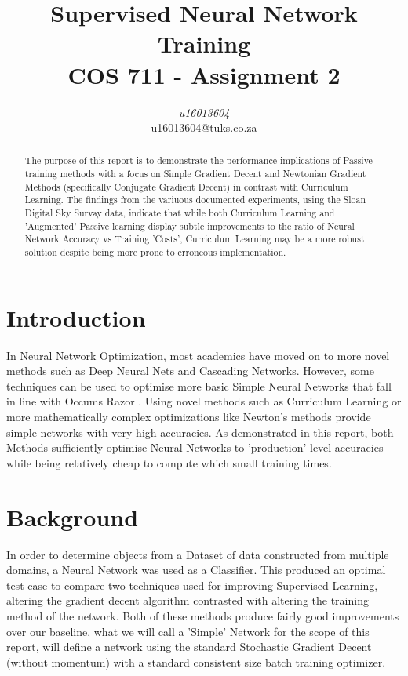 \documentclass[conference]{IEEEtran}
\begin{document}
\title{
	Supervised Neural Network Training\\
	{\footnotesize COS 711 - Assignment 2}
}

\author{
\textit{u16013604} \\
u16013604@tuks.co.za
}

\maketitle

\begin{abstract}
The purpose of this report is to demonstrate the performance implications of Passive training methods with a focus on Simple Gradient Decent and Newtonian Gradient Methods (specifically Conjugate Gradient Decent) in contrast with Curriculum Learning. The findings from the variuous documented experiments, using the Sloan Digital Sky Survay data, indicate that while both Curriculum Learning and 'Augmented' Passive learning display subtle improvements to the ratio of Neural Network Accuracy vs Training 'Costs', Curriculum Learning may be a more robust solution despite being more prone to erroneous implementation.
\end{abstract}

\section{Introduction}
In Neural Network Optimization, most academics have moved on to more novel methods such as Deep Neural Nets and Cascading Networks. However, some techniques can be used to optimise more basic Simple Neural Networks that fall in line with Occums Razor \cite{supervised-learning-slides}.
Using novel methods such as Curriculum Learning or more mathematically complex optimizations like Newton's methods provide simple networks with very high accuracies. As demonstrated in this report, both Methods sufficiently optimise Neural Networks to 'production' level accuracies while being relatively cheap to compute which small training times.


\section{Background}
In order to determine objects from a Dataset of data constructed from multiple domains, a Neural Network was used as a Classifier. 
This produced an optimal test case to compare two techniques used for improving Supervised Learning, altering the gradient decent algorithm contrasted with altering the training method of the network.
Both of these methods produce fairly good improvements over our baseline, what we will call a 'Simple' Network for the scope of this report, will define a network using the standard Stochastic Gradient Decent \cite{ketkar2017stochastic} (without momentum) with a standard consistent size batch training optimizer.
\end{document}
